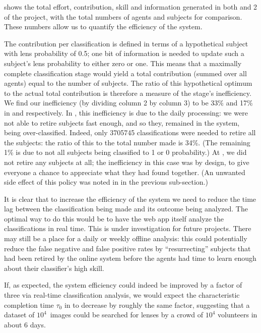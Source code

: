 \documentclass[useAMS,usenatbib,a4paper]{mn2e}
\begin{document}
 shows the total effort, contribution, skill and
information generated in both \StageOne and 2 of the \cfhtls project, with the
total numbers of agents and subjects for comparison.   These numbers allow us
to quantify the efficiency of the system.

The contribution per classification is defined in terms of a hypothetical
subject with lens probability of 0.5; one bit of information is needed to
update such a subject's lens probability to either zero or one. This means
that a maximally complete classification stage would yield a total
contribution (summed over all agents) equal to the number of subjects. The
ratio of this hypothetical optimum to the actual total contribution is
therefore a measure of the stage's inefficiency. We find our inefficiency (by
dividing column 2 by column 3) to be 33\% and 17\% in \StageOne and \StageTwo
respectively. In \StageOne, this inefficiency is due to the daily processing: we
were not able to retire subjects fast enough, and so they, remained in the
system, being over-classified. Indeed, only 3705745 classifications were
needed to retire all the subjects: the ratio of this to the total number made
is 34\%. (The remaining 1\% is due to not all subjects being classified to 1
or 0 probability.) At \StageTwo, we did not retire any subjects at all; the
inefficiency in this case was by design, to give everyone a chance to
appreciate what they had found together. (An unwanted side effect of this
policy was noted in  in the
previous sub-section.)

It is clear that to increase the efficiency of the system we need to reduce the
time lag between the classification being made and its outcome being analyzed.
The optimal way to do this would be to have the web app itself analyze the
classifications in real time. This is under investigation for future projects.
There may still be a place for a daily or weekly offline analysis: this could
potentially reduce the false negative and false positive rates by
``resurrecting'' subjects that had been retired by the online system before the
agents had time to learn enough about their classifier's high skill.

If, as expected, the system efficiency could indeed be improved by a factor of
three via real-time classification analysis, we would expect the characteristic
completion time $\tau_0$  in  to decrease by roughly the same
factor, suggesting that a dataset of $10^4$~images could be searched for lenses
by a crowd of $10^4$ volunteers in about 6 days.
\end{document}

